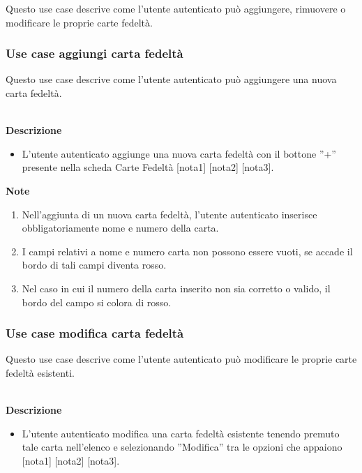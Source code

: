 \documentclass[a4paper,12pt]{article}
\begin{document}
 Questo use case descrive come l'utente autenticato può aggiungere, rimuovere o modificare le proprie carte fedeltà.
 




\subsubsection*{Use case aggiungi carta fedeltà}

 Questo use case descrive come l'utente autenticato può aggiungere una nuova carta fedeltà.
 
\textbf{\\Descrizione}
\begin{itemize} \setlength\itemsep{0.01em}
\item L'utente autenticato aggiunge una nuova carta fedeltà con il bottone ''+'' presente nella scheda Carte Fedeltà [nota1] [nota2] [nota3].
\end{itemize}

\textbf{Note}
\begin{enumerate} \setlength\itemsep{0.01em}
\item Nell'aggiunta di un nuova carta fedeltà, l'utente autenticato inserisce obbligatoriamente nome e numero della carta.
\item I campi relativi a nome e numero carta non possono essere vuoti, se accade il bordo di tali campi diventa rosso.
\item Nel caso in cui il numero della carta inserito non sia corretto o valido, il bordo del campo si colora di rosso.
\end{enumerate}




\subsubsection*{Use case modifica carta fedeltà}

 Questo use case descrive come l'utente autenticato può modificare le proprie carte fedeltà esistenti.
 
\textbf{\\Descrizione}
\begin{itemize} \setlength\itemsep{0.01em}
\item L'utente autenticato modifica una carta fedeltà esistente tenendo premuto tale carta nell'elenco e selezionando ''Modifica'' tra le opzioni che appaiono [nota1] [nota2] [nota3].
\end{itemize}
\end{document}
